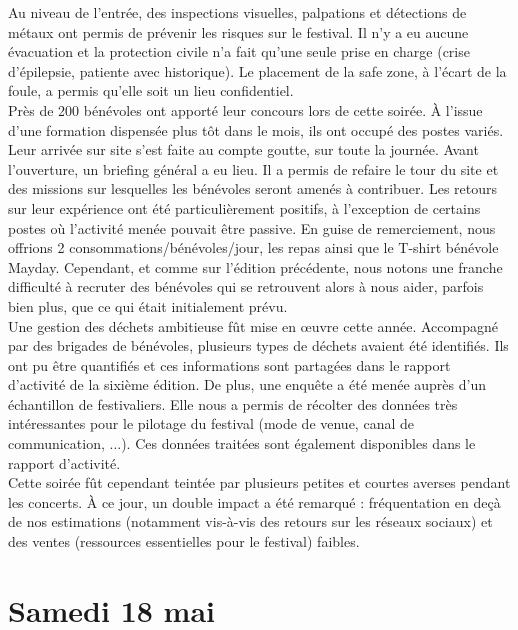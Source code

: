 \documentclass[12pt,a4paper]{report}
\begin{document}
Au niveau de l’entrée, des inspections visuelles, palpations et détections de métaux ont permis de prévenir les risques sur le festival. Il n'y a eu aucune évacuation et la protection civile n’a fait qu’une seule prise en charge (crise d'épilepsie, patiente avec historique). Le placement de la safe zone, à l'écart de la foule, a permis qu'elle soit un lieu confidentiel.\\

Près de 200 bénévoles ont apporté leur concours lors de cette soirée. À l'issue d'une formation dispensée plus tôt dans le mois, ils ont occupé des postes variés. Leur arrivée sur site s'est faite au compte goutte, sur toute la journée. Avant l'ouverture, un briefing général a eu lieu. Il a permis de refaire le tour du site et des missions sur lesquelles les bénévoles seront amenés à contribuer. Les retours sur leur expérience ont été particulièrement positifs, à l'exception de certains postes où l'activité menée pouvait être passive. En guise de remerciement, nous offrions 2 consommations/bénévoles/jour, les repas ainsi que le T-shirt bénévole Mayday. Cependant, et comme sur l'édition précédente, nous notons une franche difficulté à recruter des bénévoles qui se retrouvent alors à nous aider, parfois bien plus, que ce qui était initialement prévu.\\

Une gestion des déchets ambitieuse fût mise en œuvre cette année. Accompagné par des brigades de bénévoles, plusieurs types de déchets avaient été identifiés. Ils ont pu être quantifiés et ces informations sont partagées dans le rapport d'activité de la sixième édition. De plus, une enquête a été menée auprès d'un échantillon de festivaliers. Elle nous a permis de récolter des données très intéressantes pour le pilotage du festival (mode de venue, canal de communication, ...). Ces données traitées sont également disponibles dans le rapport d'activité.\\

Cette soirée fût cependant teintée par plusieurs petites et courtes averses pendant les concerts. À ce jour, un double impact a été remarqué : fréquentation en deçà de nos estimations (notamment vis-à-vis des retours sur les réseaux sociaux) et des ventes (ressources essentielles pour le festival) faibles.\\

\section{Samedi 18 mai}
\end{document}
